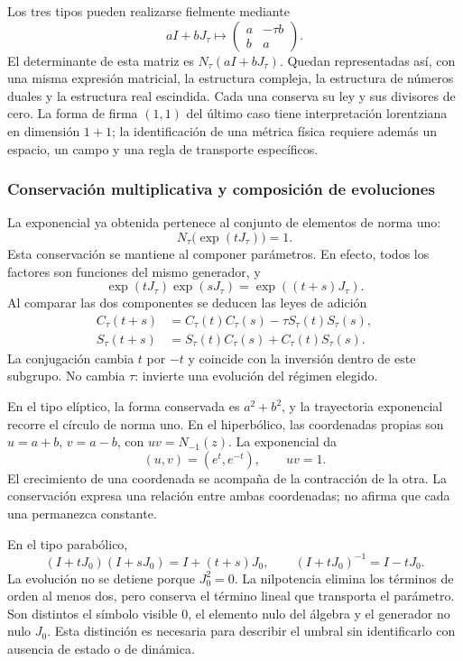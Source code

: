 Los tres tipos pueden realizarse fielmente mediante
\[
 aI+bJ_\tau\longmapsto
 \begin{pmatrix}a&-\tau b\\b&a\end{pmatrix}.
\]
El determinante de esta matriz es \(N_\tau(aI+bJ_\tau)\). Quedan
representadas así, con una misma expresión matricial, la estructura
compleja, la estructura de números duales y la estructura real escindida.
Cada una conserva su ley y sus divisores de cero. La forma de firma
\((1,1)\) del último caso tiene interpretación lorentziana en dimensión
\(1+1\); la identificación de una métrica física requiere además un espacio,
un campo y una regla de transporte específicos.

\subsubsection{Conservación multiplicativa y composición de evoluciones}
\label{trit-ampl-evoluciones}

La exponencial ya obtenida pertenece al conjunto de elementos de norma uno:
\[
 N_\tau\bigl(\exp(tJ_\tau)\bigr)=1.
\]
Esta conservación se mantiene al componer parámetros. En efecto, todos los
factores son funciones del mismo generador, y
\[
 \exp(tJ_\tau)\exp(sJ_\tau)=\exp((t+s)J_\tau).
\]
Al comparar las dos componentes se deducen las leyes de adición
\begin{align}
 C_\tau(t+s)&=C_\tau(t)C_\tau(s)-\tau S_\tau(t)S_\tau(s),\\
 S_\tau(t+s)&=S_\tau(t)C_\tau(s)+C_\tau(t)S_\tau(s).
\end{align}
La conjugación cambia \(t\) por \(-t\) y coincide con la inversión dentro
de este subgrupo. No cambia \(\tau\): invierte una evolución del régimen
elegido.

En el tipo elíptico, la forma conservada es \(a^2+b^2\), y la trayectoria
exponencial recorre el círculo de norma uno. En el hiperbólico, las
coordenadas propias son \(u=a+b\), \(v=a-b\), con \(uv=N_{-1}(z)\).
La exponencial da
\[
 (u,v)=(e^t,e^{-t}),\qquad uv=1.
\]
El crecimiento de una coordenada se acompaña de la contracción de la otra.
La conservación expresa una relación entre ambas coordenadas; no afirma que
cada una permanezca constante.

En el tipo parabólico,
\[
 (I+tJ_0)(I+sJ_0)=I+(t+s)J_0,\qquad
 (I+tJ_0)^{-1}=I-tJ_0.
\]
La evolución no se detiene porque \(J_0^2=0\). La nilpotencia elimina los
términos de orden al menos dos, pero conserva el término lineal que
transporta el parámetro. Son distintos el símbolo visible \(0\), el
elemento nulo del álgebra y el generador no nulo \(J_0\). Esta distinción
es necesaria para describir el umbral sin identificarlo con ausencia de
estado o de dinámica.

